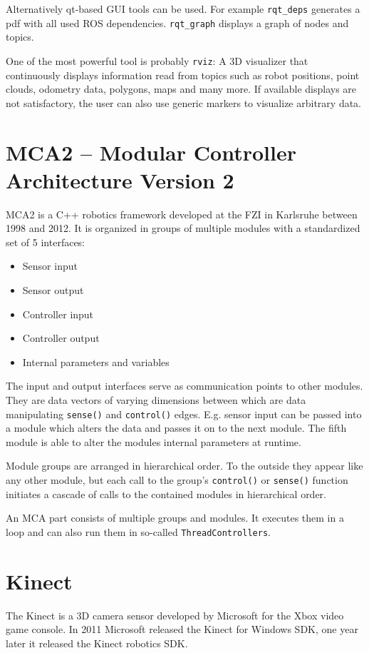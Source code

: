 Alternatively qt-based GUI tools can be used. For example \texttt{rqt\_deps} generates a pdf with all used ROS dependencies. \texttt{rqt\_graph} displays a graph of nodes and topics.

One of the most powerful tool is probably \texttt{rviz}: A 3D visualizer that continuously displays information read from topics such as robot positions, point clouds, odometry data, polygons, maps and many more. If available displays are not satisfactory, the user can also use generic markers to visualize arbitrary data.

\section{MCA2 -- Modular Controller Architecture Version 2}
MCA2 is a C++ robotics framework developed at the FZI in Karlsruhe between 1998 and 2012. It is organized in groups of multiple modules with a standardized set of 5 interfaces: 
\begin{itemize}
\item Sensor input
\item Sensor output
\item Controller input
\item Controller output
\item Internal parameters and variables
\end{itemize}

The input and output interfaces serve as communication points to other modules. They are data vectors of varying dimensions between which are data manipulating \texttt{sense()} and \texttt{control()} edges. E.g. sensor input can be passed into a module which alters the data and passes it on to the next module. The fifth module is able to alter the modules internal parameters at runtime.

Module groups are arranged in hierarchical order. To the outside they appear like any other module, but each call to the group's \texttt{control()} or \texttt{sense()} function initiates a cascade of calls to the contained modules in hierarchical order.

An MCA part consists of multiple groups and modules. It executes them in a loop and can also run them in so-called \texttt{ThreadControllers}.

\section{Kinect}
The Kinect is a 3D camera sensor developed by Microsoft for the Xbox video game console. In 2011 Microsoft released the Kinect for Windows SDK, one year later it released the Kinect robotics SDK.

